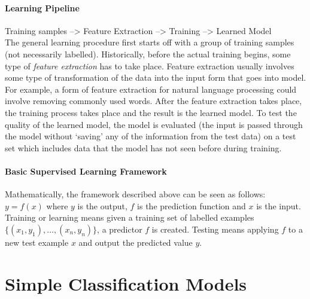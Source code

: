 \paragraph{Learning Pipeline}
Training samples --> Feature Extraction --> Training --> Learned Model \\
The general learning procedure first starts off with a group of training samples (not necessarily labelled). Historically, before the actual training begins, some type of \textit{feature extraction} has to take place. Feature extraction usually involves some type of transformation of the data into the input form that goes into model. For example, a form of feature extraction for natural language processing could involve removing commonly used words. After the feature extraction takes place, the training process takes place and the result is the learned model. To test the quality of the learned model, the model is evaluated (the input is passed through the model without `saving' any of the information from the test data) on a test set which includes data that the model has not seen before during training. 

\paragraph{Basic Supervised Learning Framework}
Mathematically, the framework described above can be seen as follows: $y = f(x)$ where $y$ is the output, $f$ is the prediction function and $x$ is the input. Training or learning means given a training set of labelled examples $\{(x_1,y_1), \dots, (x_n,y_n)\}$, a predictor $f$ is created. Testing means applying $f$ to a new test example $x$  and output the predicted value $y$. 


\section{Simple Classification Models}
